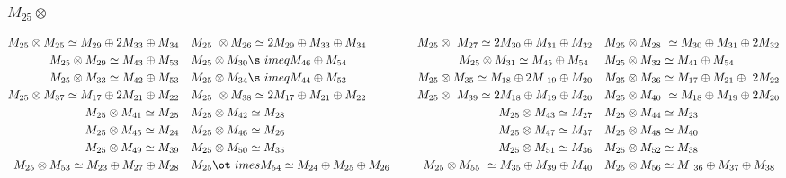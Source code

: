 \subsubsection{$M_25\otimes -$}
\begin{align*}
M_{25} \otimes M_{25} \simeq M_{29} \oplus 2 M_{33} \oplus M_{34} &&& M_{25} \
\otimes M_{26} \simeq 2 M_{29} \oplus M_{33} \oplus M_{34} &&& M_{25} \otimes \
M_{27} \simeq 2 M_{30} \oplus M_{31} \oplus M_{32} &&& M_{25} \otimes M_{28} \
\simeq M_{30} \oplus M_{31} \oplus 2 M_{32}\\
M_{25} \otimes M_{29} \simeq M_{43} \oplus M_{53} &&& M_{25} \otimes M_{30} \s\
imeq M_{46} \oplus M_{54} &&& M_{25} \otimes M_{31} \simeq M_{45} \oplus M_{54\
} &&& M_{25} \otimes M_{32} \simeq M_{41} \oplus M_{54}\\
M_{25} \otimes M_{33} \simeq M_{42} \oplus M_{53} &&& M_{25} \otimes M_{34} \s\
imeq M_{44} \oplus M_{53} &&& M_{25} \otimes M_{35} \simeq M_{18} \oplus 2 M_{\
19} \oplus M_{20} &&& M_{25} \otimes M_{36} \simeq M_{17} \oplus M_{21} \oplus\
 2 M_{22}\\
M_{25} \otimes M_{37} \simeq M_{17} \oplus 2 M_{21} \oplus M_{22} &&& M_{25} \
\otimes M_{38} \simeq 2 M_{17} \oplus M_{21} \oplus M_{22} &&& M_{25} \otimes \
M_{39} \simeq 2 M_{18} \oplus M_{19} \oplus M_{20} &&& M_{25} \otimes M_{40} \
\simeq M_{18} \oplus M_{19} \oplus 2 M_{20}\\
M_{25} \otimes M_{41} \simeq M_{25} &&& M_{25} \otimes M_{42} \simeq M_{28} &&\
& M_{25} \otimes M_{43} \simeq M_{27} &&& M_{25} \otimes M_{44} \simeq M_{23}\
\\
M_{25} \otimes M_{45} \simeq M_{24} &&& M_{25} \otimes M_{46} \simeq M_{26} &&\
& M_{25} \otimes M_{47} \simeq M_{37} &&& M_{25} \otimes M_{48} \simeq M_{40}\
\\
M_{25} \otimes M_{49} \simeq M_{39} &&& M_{25} \otimes M_{50} \simeq M_{35} &&\
& M_{25} \otimes M_{51} \simeq M_{36} &&& M_{25} \otimes M_{52} \simeq M_{38}\
\\
M_{25} \otimes M_{53} \simeq M_{23} \oplus M_{27} \oplus M_{28} &&& M_{25} \ot\
imes M_{54} \simeq M_{24} \oplus M_{25} \oplus M_{26} &&& M_{25} \otimes M_{55\
} \simeq M_{35} \oplus M_{39} \oplus M_{40} &&& M_{25} \otimes M_{56} \simeq M\
_{36} \oplus M_{37} \oplus M_{38}\\
\end{align*}

